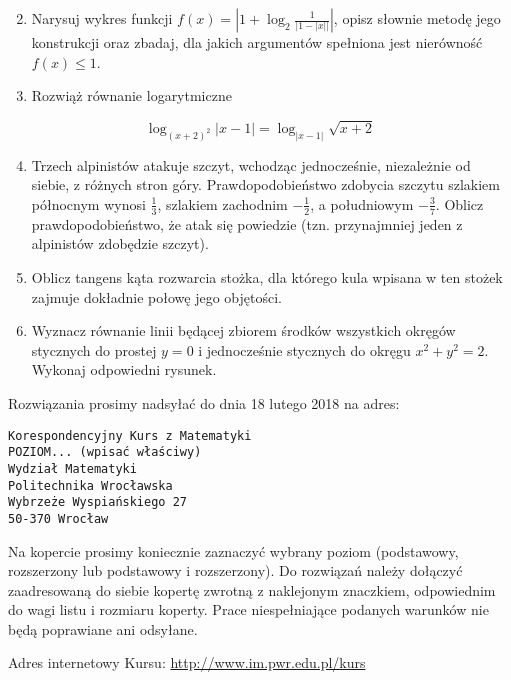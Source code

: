 \documentclass[10pt]{article}
\begin{document}
\begin{enumerate}
  \setcounter{enumi}{1}
  \item Narysuj wykres funkcji $f(x)=\left|1+\log _{2} \frac{1}{|1-|x||}\right|$, opisz słownie metodę jego konstrukcji oraz zbadaj, dla jakich argumentów spełniona jest nierówność $f(x) \leqslant 1$.
  \item Rozwiąż równanie logarytmiczne
\end{enumerate}

$$
\log _{(x+2)^{2}}|x-1|=\log _{|x-1|} \sqrt{x+2}
$$

\begin{enumerate}
  \setcounter{enumi}{3}
  \item Trzech alpinistów atakuje szczyt, wchodząc jednocześnie, niezależnie od siebie, z różnych stron góry. Prawdopodobieństwo zdobycia szczytu szlakiem północnym wynosi $\frac{1}{3}$, szlakiem zachodnim $-\frac{1}{2}$, a południowym $-\frac{3}{7}$. Oblicz prawdopodobieństwo, że atak się powiedzie (tzn. przynajmniej jeden z alpinistów zdobędzie szczyt).
  \item Oblicz tangens kąta rozwarcia stożka, dla którego kula wpisana w ten stożek zajmuje dokładnie połowę jego objętości.
  \item Wyznacz równanie linii będącej zbiorem środków wszystkich okręgów stycznych do prostej $y=0$ i jednocześnie stycznych do okręgu $x^{2}+y^{2}=2$. Wykonaj odpowiedni rysunek.
\end{enumerate}

Rozwiązania prosimy nadsyłać do dnia 18 lutego 2018 na adres:

\begin{verbatim}
Korespondencyjny Kurs z Matematyki
POZIOM... (wpisać właściwy)
Wydział Matematyki
Politechnika Wrocławska
Wybrzeże Wyspiańskiego 27
50-370 Wrocław
\end{verbatim}

Na kopercie prosimy koniecznie zaznaczyć wybrany poziom (podstawowy, rozszerzony lub podstawowy i rozszerzony). Do rozwiązań należy dołączyć zaadresowaną do siebie kopertę zwrotną z naklejonym znaczkiem, odpowiednim do wagi listu i rozmiaru koperty. Prace niespełniające podanych warunków nie będą poprawiane ani odsyłane.

Adres internetowy Kursu: \href{http://www.im.pwr.edu.pl/kurs}{http://www.im.pwr.edu.pl/kurs}
\end{document}
